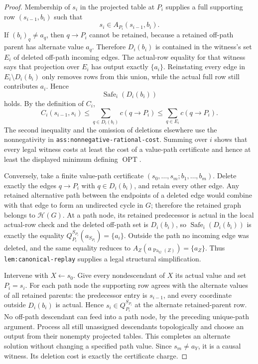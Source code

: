 \documentclass{article}
\begin{document}
\begin{proof}
Membership of \(s_i\) in the projected table at \(P_i\) supplies a full supporting row \((s_{i-1},b_i)\) such that
\[
 s_i\in A_{P_i}(s_{i-1},b_i).
\]
If \((b_i)_q\ne a_q\), then \(q\to P_i\) cannot be retained, because a retained off-path parent has alternate value \(a_q\).  Therefore \(D_i(b_i)\) is contained in the witness's set \(E_i\) of deleted off-path incoming edges.  The actual-row equality for that witness says that projection over \(E_i\) has output exactly \(\{a_i\}\).  Reinstating every edge in \(E_i\setminus D_i(b_i)\) only removes rows from this union, while the actual full row still contributes \(a_i\).  Hence
\[
 \operatorname{Safe}_i(D_i(b_i))
\]
holds.  By the definition of \(C_i\),
\[
 C_i(s_{i-1},s_i)
 \le \sum_{q\in D_i(b_i)}c(q\to P_i)
 \le \sum_{q\in E_i}c(q\to P_i).
\]
The second inequality and the omission of deletions elsewhere use the nonnegativity in \texttt{ass:nonnegative-rational-cost}.  Summing over \(i\) shows that every legal witness costs at least the cost of a value-path certificate and hence at least the displayed minimum defining \(\operatorname{OPT}\).

Conversely, take a finite value-path certificate \((s_0,\ldots,s_m;b_1,\ldots,b_m)\).  Delete exactly the edges \(q\to P_i\) with \(q\in D_i(b_i)\), and retain every other edge.  Any retained alternative path between the endpoints of a deleted edge would combine with that edge to form an undirected cycle in \(G\); therefore the retained graph belongs to \(\mathcal H(G)\).  At a path node, its retained predecessor is actual in the local actual-row check and the deleted off-path set is \(D_i(b_i)\), so \(\operatorname{Safe}_i(D_i(b_i))\) is exactly the equality \(Q_{P_i}^{S_{P_i}}(a_{S_{P_i}})=\{a_i\}\).  Outside the path no incoming edge was deleted, and the same equality reduces to \(A_Z(a_{\operatorname{Pa}_G(Z)})=\{a_Z\}\).  Thus \texttt{lem:canonical-replay} supplies a legal structural simplification.

Intervene with \(X\leftarrow s_0\).  Give every nondescendant of \(X\) its actual value and set \(P_i=s_i\).  For each path node the supporting row agrees with the alternate values of all retained parents: the predecessor entry is \(s_{i-1}\), and every coordinate outside \(D_i(b_i)\) is actual.  Hence \(s_i\in Q_{P_i}^{S_{P_i}}\) at the alternate retained-parent row.  No off-path descendant can feed into a path node, by the preceding unique-path argument.  Process all still unassigned descendants topologically and choose an output from their nonempty projected tables.  This completes an alternate solution without changing a specified path value.  Since \(s_m\ne a_Y\), it is a causal witness.  Its deletion cost is exactly the certificate charge.


\end{proof}
\end{document}
